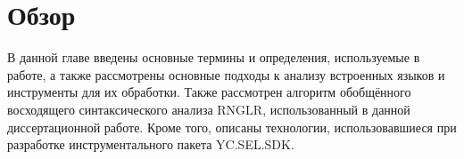 \chapter{Обзор}\label{relWorks}

В данной главе введены основные термины и определения, используемые в работе, а также рассмотрены основные подходы к анализу встроенных языков и инструменты для их обработки. Также рассмотрен алгоритм обобщённого восходящего синтаксического анализа RNGLR, использованный в данной диссертационной работе. Кроме того, описаны технологии, использовавшиеся при разработке инструментального пакета YC.SEL.SDK.

\clearpage
